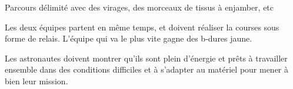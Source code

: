 \documentclass{grand-jeu}
\begin{document}
\begin{liste-materiel}
\end{liste-materiel}

\begin{regles}
Parcours délimité avec des virages, des morceaux de tissus à enjamber, etc

Les deux équipes partent en même temps, et doivent réaliser la courses sous forme de relais. 
L’équipe qui va le plus vite gagne des b-dures jaune. 

\end{regles}

\begin{imaginaire}
Les astronautes doivent montrer qu'ils sont plein d'énergie et prêts à travailler ensemble dans des conditions difficiles et à s'adapter au matériel pour mener à bien leur mission.  
\end{imaginaire}

\begin{moments-stop}
\end{moments-stop}
\end{document}

